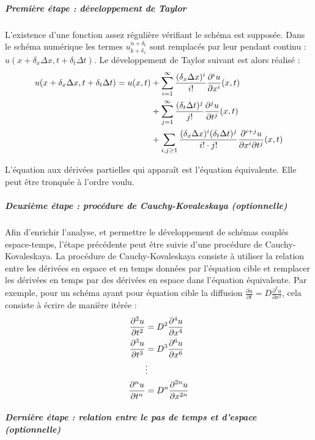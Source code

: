         \subparagraph{Première étape : développement de Taylor}

        L'existence d'une fonction assez régulière vérifiant le schéma est supposée.
        Dans le schéma numérique les termes $u^{n+\delta_t}_{k+\delta_x}$ sont remplacés par leur pendant
        continu : $u(x+\delta_x \Delta x, t + \delta_t \Delta t)$. Le développement de Taylor suivant est alors réalisé :
        \begin{align}
        u(x+\delta_x \Delta x, t + \delta_t \Delta t) = u(x,t)
        &+ \sum_{i=1}^{\infty} \frac{(\delta_x \Delta x)^i}{i!}
        \frac{\partial^i u}{\partial x^i}(x,t) \notag \\
        &+ \sum_{j=1}^{\infty} \frac{(\delta_t \Delta t)^j}{j!}
        \frac{\partial^j u}{\partial t^j}(x,t) \notag \\
        &+ \sum_{i,j \geq 1} \frac{(\delta_x \Delta x)^i (\delta_t \Delta t)^j}{i! \cdot j!}
        \frac{\partial^{i+j} u}{\partial x^i \partial t^j}(x,t)
        \end{align}

        L'équation aux dérivées partielles qui apparaît est l'équation équivalente. Elle peut être tronquée à l'ordre voulu.

        \subparagraph{Deuxième étape : procédure de Cauchy-Kovaleskaya (optionnelle)}

        Afin d'enrichir l'analyse, et permettre le développement de schémas couplés espace-temps, l'étape précédente peut être suivie d'une procédure de Cauchy-Kovaleskaya.
        La procédure de Cauchy-Kovaleskaya consiste à utiliser la relation entre les dérivées en espace et en temps données par l'équation cible et remplacer les dérivées en temps par des dérivées en espace dans l'équation équivalente.
        Par exemple, pour un schéma ayant pour équation cible la diffusion $\frac{\partial u}{\partial t} = D \frac{\partial^2 u}{\partial x^2}$, cela consiste à écrire de manière itérée :
        \begin{align}
        \frac{\partial^2 u}{\partial t^2} &= D^2 \frac{\partial^4 u}{\partial x^4} \notag \\
        \frac{\partial^3 u}{\partial t^3} &= D^3 \frac{\partial^6 u}{\partial x^6} \notag \\
        &\vdots \notag \\
        \frac{\partial^n u}{\partial t^n} &= D^n \frac{\partial^{2n} u}{\partial x^{2n}}
        \end{align}

        \subparagraph{Dernière étape : relation entre le pas de temps et d'espace (optionnelle)}


